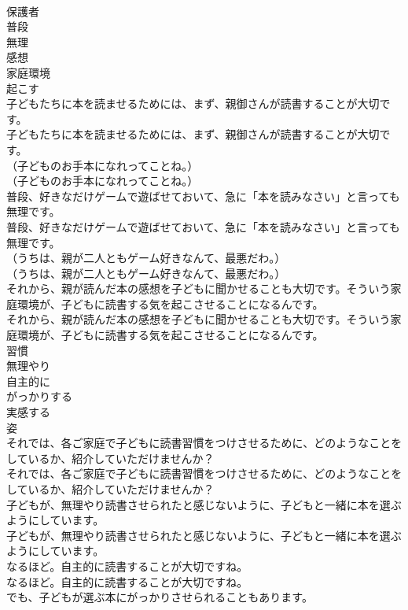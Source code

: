 \documentclass[8pt]{extreport}
\begin{document}
\begin{CJK}{UTF8}{min}
\\	保護者
\\	普段
\\	無理
\\	感想
\\	家庭環境
\\	起こす
\\	子どもたちに本を読ませるためには、まず、親御さんが読書することが大切です。	
\\	子どもたちに本を読ませるためには、まず、親御さんが読書することが大切です。 
\\	（子どものお手本になれってことね。）	
\\	（子どものお手本になれってことね。） 
\\	普段、好きなだけゲームで遊ばせておいて、急に「本を読みなさい」と言っても無理です。	
\\	普段、好きなだけゲームで遊ばせておいて、急に「本を読みなさい」と言っても無理です。 
\\	（うちは、親が二人ともゲーム好きなんて、最悪だわ。）	
\\	（うちは、親が二人ともゲーム好きなんて、最悪だわ。） 
\\	それから、親が読んだ本の感想を子どもに聞かせることも大切です。そういう家庭環境が、子どもに読書する気を起こさせることになるんです。	
\\	それから、親が読んだ本の感想を子どもに聞かせることも大切です。そういう家庭環境が、子どもに読書する気を起こさせることになるんです。 
\\	習慣
\\	無理やり
\\	自主的に
\\	がっかりする
\\	実感する
\\	姿
\\	それでは、各ご家庭で子どもに読書習慣をつけさせるために、どのようなことをしているか、紹介していただけませんか？	
\\	それでは、各ご家庭で子どもに読書習慣をつけさせるために、どのようなことをしているか、紹介していただけませんか？ 
\\	子どもが、無理やり読書させられたと感じないように、子どもと一緒に本を選ぶようにしています。	
\\	子どもが、無理やり読書させられたと感じないように、子どもと一緒に本を選ぶようにしています。 
\\	なるほど。自主的に読書することが大切ですね。	
\\	なるほど。自主的に読書することが大切ですね。 
\\	でも、子どもが選ぶ本にがっかりさせられることもあります。	

\end{CJK}
\end{document}
